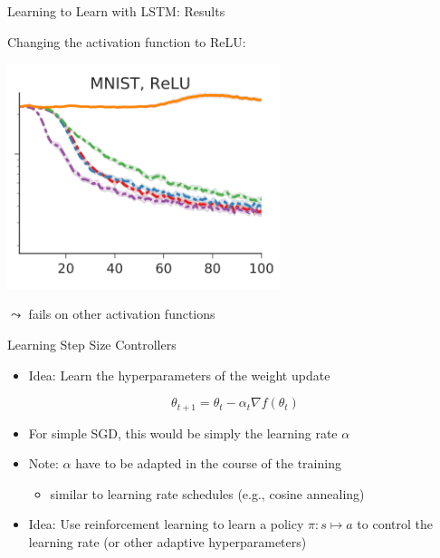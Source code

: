 \begin{frame}[c]{Learning to Learn with LSTM: Results\newline {}}

Changing the activation function to ReLU:
\smallskip

\centering
\includegraphics[width=0.6\textwidth]{images/l2l_mnist_relu}

$\leadsto$ fails on other activation functions

\end{frame}
\begin{frame}[c]{Learning Step Size Controllers }

\begin{itemize}
	\item \alert{Idea:} Learn the hyperparameters of the weight update 
\end{itemize}

\begin{equation}
\theta_{t+1} = \theta_t - \alpha_t \nabla f(\theta_t) \nonumber
\end{equation}

\begin{itemize}
	\item For simple SGD, this would be simply the learning rate $\alpha$
	\pause
	\item \alert{Note}: $\alpha$ have to be adapted in the course of the training
	\begin{itemize}
		\item similar to learning rate schedules (e.g., cosine annealing)
	\end{itemize}
	\medskip
	\pause
	\item Idea: Use reinforcement learning to learn a policy $\pi: s \mapsto a$ to control the learning rate (or other adaptive hyperparameters)
\end{itemize}



\end{frame}
